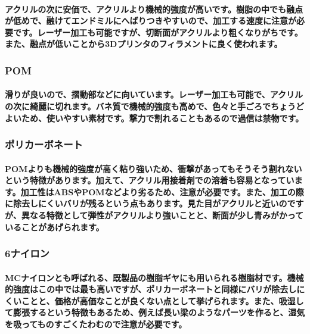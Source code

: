 \documentclass[b5paper, 9pt, twocolumn, titlepage]{jsbook}%
\begin{document}
\paragraph{アクリルの次に安価で、アクリルより機械的強度が高いです。樹脂の中でも融点が低めで、融けてエンドミルにへばりつきやすいので、加工する速度に注意が必要です。レーザー加工も可能ですが、切断面がアクリルより粗くなりがちです。また、融点が低いことから3Dプリンタのフィラメントに良く使われます。}

\subsubsection{POM}

\paragraph{滑りが良いので、摺動部などに向いています。レーザー加工も可能で、アクリルの次に綺麗に切れます。バネ質で機械的強度も高めで、色々と手ごろでちょうどよいため、使いやすい素材です。撃力で割れることもあるので過信は禁物です。}

\subsubsection{ポリカーボネート}

\paragraph{POMよりも機械的強度が高く粘り強いため、衝撃があってもそうそう割れないという特徴があります。加えて、アクリル用接着剤での溶着も容易となっています。加工性はABSやPOMなどより劣るため、注意が必要です。また、加工の際に除去しにくいバリが残るという点もあります。見た目がアクリルと近いのですが、異なる特徴として弾性がアクリルより強いことと、断面が少し青みがかっていることがあげられます。}

\subsubsection{6ナイロン}

\paragraph{MCナイロンとも呼ばれる、既製品の樹脂ギヤにも用いられる樹脂材です。機械的強度はこの中では最も高いですが、ポリカーボネートと同様にバリが除去しにくいことと、価格が高価なことが良くない点として挙げられます。また、吸湿して膨張するという特徴もあるため、例えば長い梁のようなパーツを作ると、湿気を吸ってものすごくたわむので注意が必要です。}
\end{document}
